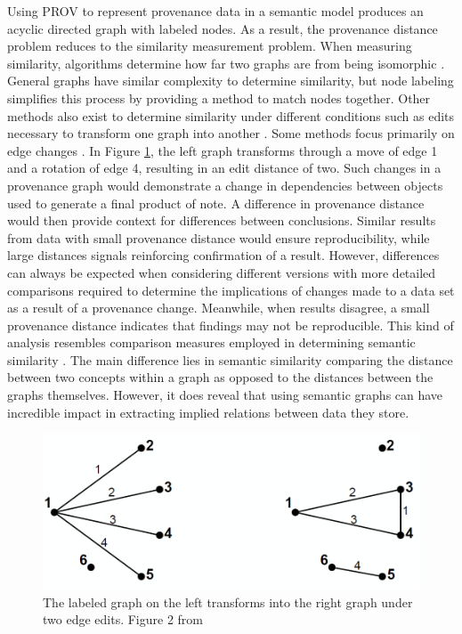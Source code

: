 Using PROV to represent provenance data in a semantic model produces an acyclic directed graph with labeled nodes.
As a result, the provenance distance problem reduces to the similarity measurement problem.
When measuring similarity, algorithms determine how far two graphs are from being isomorphic \cite{Cao2013}.
General graphs have similar complexity to determine similarity, but node labeling simplifies this process by providing a method to match nodes together.
Other methods also exist to determine similarity under different conditions such as edits necessary to transform one graph into another  \cite{Gao2010}.
Some methods focus primarily on edge changes \cite{Goddard:1996:DGU:246962.246972}.
In Figure \ref{GraphEdit}, the left graph transforms through a move of edge 1 and a rotation of edge 4, resulting in an edit distance of two.
Such changes in a provenance graph would demonstrate a change in dependencies between objects used to generate a final product of note.
A difference in provenance distance would then provide context for differences between conclusions.
Similar results from data with small provenance distance would ensure reproducibility, while large distances signals reinforcing confirmation of a result.
However, differences can always be expected when considering different versions with more detailed comparisons required to determine the implications of changes made to a data set as a result of a provenance change.
Meanwhile, when results disagree, a small provenance distance indicates that findings may not be reproducible.
This kind of analysis resembles comparison measures employed in determining semantic similarity \cite{Hliaoutakis06informationretrieval}.
The main difference lies in semantic similarity comparing the distance between two concepts within a graph as opposed to the distances between the graphs themselves.
However, it does reveal that using semantic graphs can have incredible impact in extracting implied relations between data they store.

\begin{figure}
	\centering
	\includegraphics[scale=0.40]{figures/GraphEdit.png}
	\caption{The labeled graph on the left transforms into the right graph under two edge edits. Figure 2 from \cite{Goddard:1996:DGU:246962.246972}}
	\label{GraphEdit}
\end{figure}

